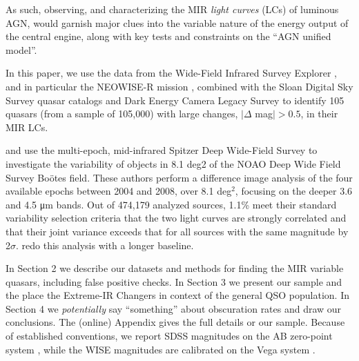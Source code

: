 \documentclass{emulateapj}
\begin{document}
As such, observing, and characterizing the MIR {\it light curves} (LCs) of
luminous AGN, would garnish major clues into the variable nature of
the energy output of the central engine, along with key tests and
constraints on the ``AGN unified model''.

In this paper, we use the data from the Wide-Field
Infrared Survey Explorer \citep[WISE; ][]{Wright10}, and in particular
the NEOWISE-R mission \citep{Mainzer14, Meisner16}, combined with the
Sloan Digital Sky Survey quasar catalogs \citep[DR7Q][]{Schneider10}
and Dark Energy Camera Legacy Survey \citep[DECaLS][]{Lang16} to
identify 105 quasars (from a sample of 105,000) with large changes,
$|\Delta$ mag$|>0.5$, in their MIR LCs. 

\citet{Kozlowski2010} and use the multi-epoch, mid-infrared Spitzer
Deep Wide-Field Survey to investigate the variability of objects in
8.1 deg2 of the NOAO Deep Wide Field Survey Boötes field.  These
authors perform a difference image analysis of the four available
epochs between 2004 and 2008, over 8.1 deg$^2$, focusing on the deeper
3.6 and 4.5 μm bands. Out of 474,179 analyzed sources, 1.1\% meet
their standard variability selection criteria that the two light
curves are strongly correlated and that their joint variance exceeds
that for all sources with the same magnitude by 2$\sigma$.
\citet{Kozlowski2016} redo this analysis with a longer baseline.

In Section 2 we describe our datasets and methods for finding the MIR
variable quasars, including false positive checks. In Section 3 we
present our sample and the place the Extreme-IR Changers in context of
the general QSO population. In Section 4 we {\it potentially} say
``something'' about obscuration rates and draw our conclusions. 
The (online) Appendix gives the full details or our sample. 
Because of established conventions, we report SDSS magnitudes on the
AB zero-point system \citep{Oke83, Fukugita96}, while the WISE
magnitudes are calibrated on the Vega system \citep{Wright10}.



\end{document}
